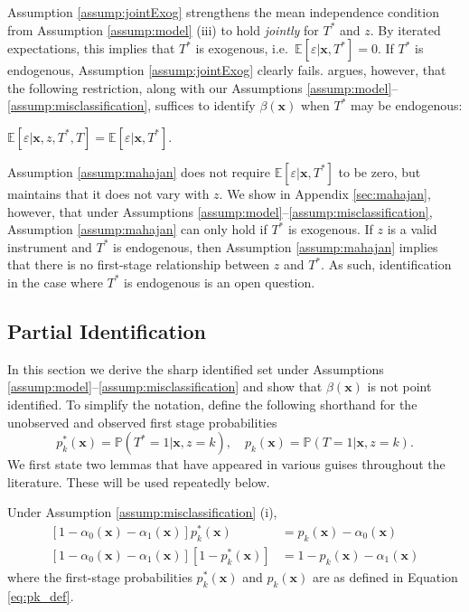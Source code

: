 Assumption \ref{assump:jointExog} strengthens the mean independence condition from Assumption \ref{assump:model} (iii) to hold \emph{jointly} for $T^*$ and $z$.
By iterated expectations, this implies that $T^*$ is exogenous, i.e.\ $\mathbb{E}[\varepsilon|\mathbf{x},T^*] = 0$.
If $T^*$ is endogenous, Assumption \ref{assump:jointExog} clearly fails.
\cite{Mahajan} argues, however, that the following restriction, along with our Assumptions \ref{assump:model}--\ref{assump:misclassification}, suffices to identify $\beta(\mathbf{x})$ when $T^*$ may be endogenous:
\begin{assump} \mbox{}
  \label{assump:mahajan}
  $\mathbb{E}[\varepsilon|\mathbf{x}, z, T^*, T] = \mathbb{E}[\varepsilon|\mathbf{x},T^*]$.
\end{assump}
Assumption \ref{assump:mahajan} does not require $\mathbb{E}[\varepsilon|\mathbf{x},T^*]$ to be zero, but maintains that it does not vary with $z$.
We show in Appendix \ref{sec:mahajan}, however, that under 
Assumptions \ref{assump:model}--\ref{assump:misclassification}, Assumption \ref{assump:mahajan} can only hold if $T^*$ is exogenous.
If $z$ is a valid instrument and $T^*$ is endogenous, then Assumption \ref{assump:mahajan} implies that there is no first-stage relationship between $z$ and $T^*$.
As such, identification in the case where $T^*$ is endogenous is an open question. 




\subsection{Partial Identification}
\label{sec:partial}

In this section we derive the sharp identified set under Assumptions \ref{assump:model}--\ref{assump:misclassification} and show that  $\beta(\mathbf{x})$ is not point identified.
To simplify the notation, define the following shorthand for the unobserved and observed first stage probabilities
\begin{equation}
  p^*_k(\mathbf{x}) = \mathbb{P}(T^*=1|\mathbf{x},z=k), \quad
  p_k(\mathbf{x}) = \mathbb{P}(T=1|\mathbf{x},z=k).
  \label{eq:pk_def}
\end{equation}
We first state two lemmas that have appeared in various guises throughout the literature. 
These will be used repeatedly below.
\begin{lem}
\label{lem:p_pstar}
  Under Assumption \ref{assump:misclassification} (i),
\begin{align*}
  \left[ 1 - \alpha_0(\mathbf{x}) - \alpha_1(\mathbf{x}) \right]p^*_k(\mathbf{x}) &= p_k(\mathbf{x}) - \alpha_0(\mathbf{x})\\
  \left[ 1 - \alpha_0(\mathbf{x}) - \alpha_1(\mathbf{x}) \right]\left[1 - p^*_k(\mathbf{x}) \right]&= 1 - p_k(\mathbf{x}) - \alpha_1(\mathbf{x})
\end{align*}
where the first-stage probabilities $p_k^*(\mathbf{x})$ and $p_k(\mathbf{x})$ are as defined in Equation \ref{eq:pk_def}.
\end{lem} 

